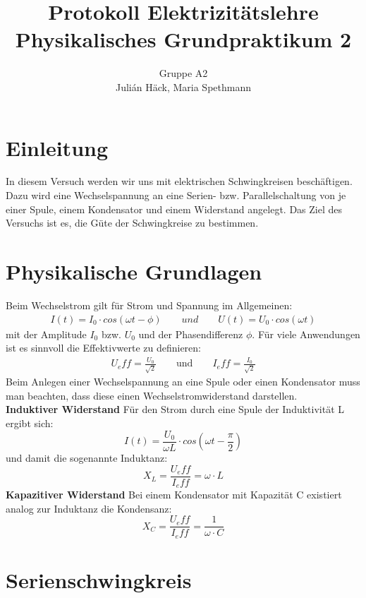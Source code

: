 \documentclass[12pt,a4paper]{article}
\author{Gruppe A2 \\ Julián Häck, Maria Spethmann}
\title{Protokoll Elektrizitätslehre \\ Physikalisches Grundpraktikum 2}
\begin{document}
	\maketitle
	\thispagestyle{empty} %
	\newpage
	\pagestyle{headings} %
	\tableofcontents
	\newpage

\section{Einleitung}
In diesem Versuch werden wir uns mit elektrischen Schwingkreisen beschäftigen. Dazu wird eine Wechselspannung an eine Serien- bzw. Parallelschaltung von je einer Spule, einem Kondensator und einem Widerstand angelegt. Das Ziel des Versuchs ist es, die Güte der Schwingkreise zu bestimmen.
\section{Physikalische Grundlagen}
Beim Wechselstrom gilt für Strom und Spannung im Allgemeinen:
\begin{align}
I(t)=I_0\cdot cos(\omega t - \phi) \qquad und \qquad U(t)=U_0\cdot cos(\omega t)
\end{align}
mit der Amplitude $I_0$ bzw. $U_0$ und der Phasendifferenz $\phi$.
Für viele Anwendungen ist es sinnvoll die Effektivwerte zu definieren:
\begin{align}
U_eff = \frac{U_0}{\sqrt{2}} \qquad \text{und} \qquad I_eff = \frac{I_0}{\sqrt{2}}
\end{align}
Beim Anlegen einer Wechselspannung an eine Spule oder einen Kondensator muss man beachten, dass diese einen Wechselstromwiderstand darstellen.\\
\textbf{Induktiver Widerstand}
Für den Strom durch eine Spule der Induktivität L ergibt sich:
\begin{equation}
I(t)=\frac{U_0}{\omega L}\cdot cos(\omega t- \frac{\pi}{2})
\end{equation}
und damit die sogenannte Induktanz:
\begin{equation}
X_L=\frac{U_eff}{I_eff}=\omega \cdot L
\end{equation}
\textbf{Kapazitiver Widerstand}
Bei einem Kondensator mit Kapazität C existiert analog zur Induktanz die Kondensanz:
\begin{equation}
X_C=\frac{U_eff}{I_eff}=\frac{1}{\omega \cdot C}
\end{equation}
\section{Serienschwingkreis}
\end{document}
